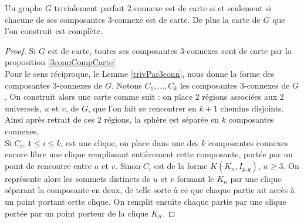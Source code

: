 \documentclass{scrartcl}
\begin{document}
\begin{flushleft}
\begin{theorem}\label{maptrivperf}
    Un graphe $G$ trivialement parfait $2$-connexe est de carte si et seulement si chacune de ses composantes $3$-connexe est de carte.
    De plus la carte de $G$ que l'on construit est complète.
\end{theorem}

\begin{proof}
    Si $G$ est de carte, toutes ses composantes $3$-connexes sont de carte par la proposition \ref{3connCompCarte}\\
    Pour le sens réciproque, le Lemme \ref{trivPar3conn}, nous donne la forme des composantes $3$-connexes de $G$.
    Notons $C_1, ..., C_k$ les composantes $3$-connexes de $G$. On construit alors une carte comme suit :
    on place $2$ régions associées aux $2$ universels, $u$ et $v$, de $G$, que l'on fait se rencontrer en $k+1$ chemins disjoints.
    Ainsi après retrait de ces $2$ régions, la sphère est séparée en $k$ composantes connexes.\\
    Si $C_i$, $1 \leq i \leq k$, est une clique, on place dans une des $k$ composantes connexes encore libre une clique
    remplissant entièrement cette composante, portée par un point de rencontre entre $u$ et $v$. Sinon $C_i$ est
    de la forme $K(K_n, I_{p,q})$, $n \geq 3$. On représente alors les sommets distincts de $u$ et $v$ formant le $K_n$
    par une clique séparant la composante en deux, de telle sorte à ce que chaque partie ait accès à un point portant
    cette clique. On remplit ensuite chaque partie par une clique portée par un point porteur de la clique $K_n$.
\end{proof}


\end{flushleft}
\end{document}
